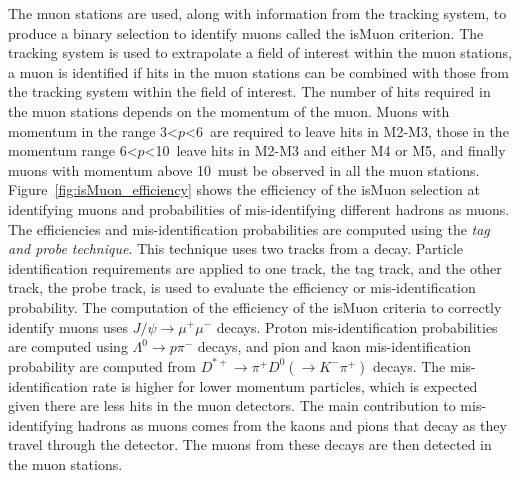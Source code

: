 The muon stations are used, along with information from the tracking system, to produce a binary selection to identify muons called the isMuon criterion. The tracking system is used to extrapolate a field of interest within the muon stations, a muon is identified if hits in the muon stations can be combined with those from the tracking system within the field of interest. The number of hits required in the muon stations depends on the momentum of the muon. Muons with momentum in the range 3<$p$<6~\gevc are required to leave hits in M2-M3, those in the momentum range 6<$p$<10~\gevc leave hits in M2-M3 and either M4 or M5, and finally muons with momentum above 10~\gevc must be observed in all the muon stations. Figure~\ref{fig:isMuon_efficiency} shows the efficiency of the isMuon selection at identifying muons and probabilities of mis-identifying different hadrons as muons. The efficiencies and mis-identification probabilities are computed using the {\it tag and probe technique}. This technique uses two tracks from a decay. Particle identification requirements are applied to one track, the tag track, and the other track, the probe track, is used to evaluate the efficiency or mis-identification probability. The computation of the efficiency of the isMuon criteria to correctly identify muons uses $J/\psi \to \mu^+ \mu^-$ decays. Proton mis-identification probabilities are computed using $\Lambda^0 \to p \pi^-$ decays, and pion and kaon mis-identification probability are computed from $D^{*+} \to \pi^+ D^0 (\to K^- \pi^+)$ decays. The mis-identification rate is higher for lower momentum particles, which is expected given there are less hits in the muon detectors. The main contribution to mis-identifying hadrons as muons comes from the kaons and pions that decay as they travel through the detector. The muons from these decays are then detected in the muon stations.


